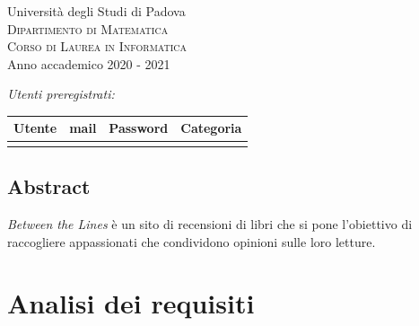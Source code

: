 \documentclass[12pt,a4paper,headings=optiontohead]{article}
\begin{document}
\begin{titlepage}
\vspace{1.5cm}
{\LARGE Università degli Studi di Padova}\\[0.4cm] %
\textsc{\large{Dipartimento di Matematica}}\\[0.05cm]
\textsc{\large{Corso di Laurea in Informatica}}\\[0.5cm]%
{\Large Anno accademico 2020 - 2021}\\ %

\vfill %



\emph{\Large{Utenti preregistrati:}}\\

\renewcommand{\arraystretch}{1.4}
 \begin{center}
 \begin{tabular}{|r|l|l|l|}
 \hline
\textbf{Utente} & \textbf{mail} & \textbf{Password} & \textbf{Categoria}  \\ \hline \hline
 &  &  & \\ \hline

 \end{tabular}
 \end{center}

\end{titlepage}


\begin{center}
\pagebreak

\section*{Abstract}
\begin{minipage}{0.9\textwidth} 
\large{\textit{Between the Lines} è un sito di recensioni di libri che si pone l'obiettivo di raccogliere appassionati che condividono opinioni sulle loro letture.}
\end{minipage}
\end{center}
\pagebreak

\tableofcontents

\section{Analisi dei requisiti}
\end{document}
